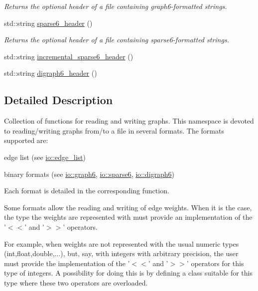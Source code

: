 \begin{DoxyCompactItemize}
\begin{DoxyCompactList}\small\item\em Returns the optional header of a file containing graph6-\/formatted strings. \end{DoxyCompactList}\item 
\hypertarget{namespacelgraph_1_1io_ae84792a42d9b8e6f312635e00d774164}{std\-::string \hyperlink{namespacelgraph_1_1io_ae84792a42d9b8e6f312635e00d774164}{sparse6\-\_\-header} ()}\label{namespacelgraph_1_1io_ae84792a42d9b8e6f312635e00d774164}

\begin{DoxyCompactList}\small\item\em Returns the optional header of a file containing sparse6-\/formatted strings. \end{DoxyCompactList}\item 
std\-::string \hyperlink{namespacelgraph_1_1io_a22c81bcdaaa74ddd2651a92fde479c61}{incremental\-\_\-sparse6\-\_\-header} ()
\item 
std\-::string \hyperlink{namespacelgraph_1_1io_a045d4701d064cd1f3be3775c3edad35f}{digraph6\-\_\-header} ()
\end{DoxyCompactItemize}


\subsection{Detailed Description}
Collection of functions for reading and writing graphs. This namespace is devoted to reading/writing graphs from/to a file in several formats. The formats supported are\-:


\begin{DoxyItemize}
\item edge list (see \hyperlink{namespacelgraph_1_1io_1_1edge__list}{io\-::edge\-\_\-list})
\item binary formats (see \hyperlink{namespacelgraph_1_1io_1_1graph6}{io\-::graph6}, \hyperlink{namespacelgraph_1_1io_1_1sparse6}{io\-::sparse6}, \hyperlink{namespacelgraph_1_1io_1_1digraph6}{io\-::digraph6})
\end{DoxyItemize}

Each format is detailed in the corresponding function.

Some formats allow the reading and writing of edge weights. When it is the case, the type the weights are represented with must provide an implementation of the '$<$$<$' and '$>$$>$' operators.

For example, when weights are not represented with the usual numeric types (int,float,double,...), but, say, with integers with arbitrary precision, the user must provide the implementation of the '$<$$<$' and '$>$$>$' operators for this type of integers. A possibility for doing this is by defining a class suitable for this type where these two operators are overloaded. 

